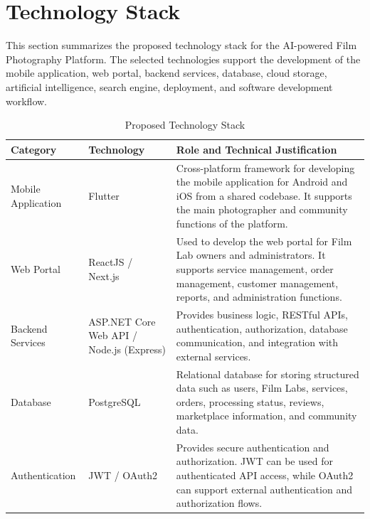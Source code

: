 
\section{Technology Stack}


This section summarizes the proposed technology stack for the
AI-powered Film Photography Platform. The selected technologies
support the development of the mobile application, web portal,
backend services, database, cloud storage, artificial intelligence,
search engine, deployment, and software development workflow.

\begin{table}[htbp]
\centering
\small
\renewcommand{\arraystretch}{0.85}
\caption{Proposed Technology Stack}
\label{tab:technology-stack}
\begin{tabular}{|p{2.8cm}|p{3.5cm}|p{6.2cm}|}
\hline
\textbf{Category} & \textbf{Technology} & \textbf{Role and Technical Justification} \\
\hline

Mobile Application &
Flutter &
Cross-platform framework for developing the mobile application
for Android and iOS from a shared codebase. It supports the main
photographer and community functions of the platform. \\
\hline

Web Portal &
ReactJS / Next.js &
Used to develop the web portal for Film Lab owners and
administrators. It supports service management, order management,
customer management, reports, and administration functions. \\
\hline

Backend Services &
ASP.NET Core Web API / Node.js (Express) &
Provides business logic, RESTful APIs, authentication,
authorization, database communication, and integration with
external services. \\
\hline

Database &
PostgreSQL &
Relational database for storing structured data such as users,
Film Labs, services, orders, processing status, reviews,
marketplace information, and community data. \\
\hline

Authentication &
JWT / OAuth2 &
Provides secure authentication and authorization. JWT can be used
for authenticated API access, while OAuth2 can support external
authentication and authorization flows. \\
\hline


\end{tabular}
\end{table}
